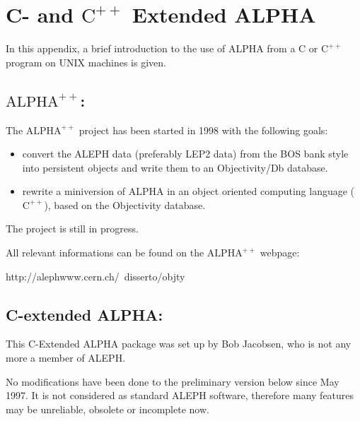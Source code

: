 \chapter{\label{sec-cextalp}C- and $\mathrm{C^{++}}$ Extended ALPHA}
\par
In this appendix, a brief introduction to the use of
ALPHA from a C or $\mathrm{C^{++}}$ program on UNIX machines is given.

\par  
\section{\label{sec-ALPHAPL} $\mathrm{ALPHA^{++}}$:}


The $\mathrm{ALPHA^{++}}$ project has been started in 1998 with the following
goals:

\begin{itemize}
\item convert the ALEPH data (preferably LEP2 data) from the BOS bank style into
persistent objects and write them to an Objectivity/Db database. 

\item
 rewrite a miniversion of ALPHA in an object oriented
     computing language ($\mathrm{C^{++}}$), based on the Objectivity database. 
          
\end{itemize}

The project is still in progress. 

All relevant informations can be found on the $\mathrm{ALPHA^{++}}$  webpage:
 
         http://alephwww.cern.ch/~disserto/objty

\par

\section{\label{sec-ALPHACE} C-extended ALPHA:}
 

  This C-Extended ALPHA package was set up by 
Bob Jacobsen, who is not any more a member of ALEPH.

No modifications have been done to the preliminary version below since May 1997.
It is not considered as standard ALEPH software, therefore many features may be
unreliable, obsolete or incomplete  now.

